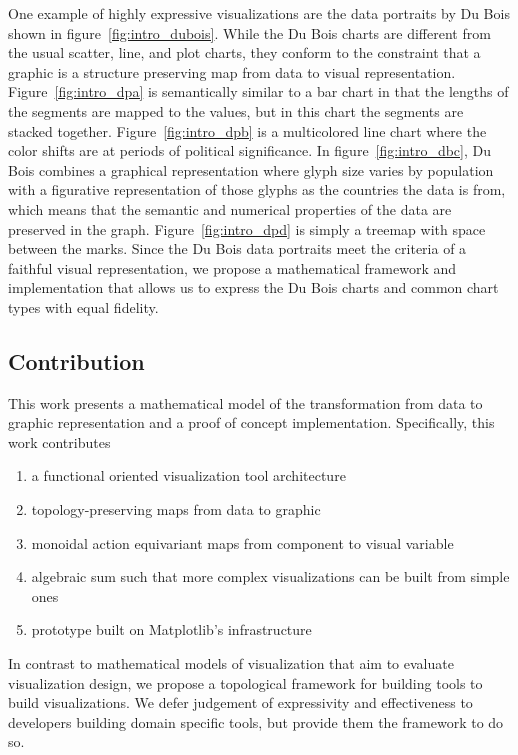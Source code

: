 \documentclass[../main.tex]{subfiles}
\begin{document}
One example of highly expressive visualizations are the data portraits by Du Bois shown in figure~\ref{fig:intro_dubois}. While the Du Bois charts are different from the usual scatter, line, and plot charts, they conform to the constraint that a graphic is a structure preserving map from data to visual representation. Figure~\ref{fig:intro_dpa} is semantically similar to a bar chart in that the lengths of the segments are mapped to the values, but in this chart the segments are stacked together. Figure~\ref{fig:intro_dpb} is a multicolored line chart where the color shifts are at periods of political significance. In figure~\ref{fig:intro_dbc}, Du Bois combines a graphical representation where glyph size varies by population with a figurative representation of those glyphs as the countries the data is from, which means that the semantic and numerical properties of the data are preserved in the graph. Figure~\ref{fig:intro_dpd} is simply a treemap\cite{heerTourVisualizationZoo2010} with space between the marks. Since the Du Bois data portraits meet the criteria of a faithful visual representation, we propose a mathematical framework and implementation that allows us to express the Du Bois charts and common chart types with equal fidelity. 

\subsection{Contribution}
This work presents a mathematical model of the transformation from data to graphic representation and a proof of concept implementation. Specifically, this work contributes

\begin{enumerate}
    \item a functional oriented visualization tool architecture
    \item topology-preserving maps from data to graphic 
    \item monoidal action equivariant maps from component to visual variable 
    \item algebraic sum such that more complex visualizations can be built from simple ones 
    \item prototype built on Matplotlib's infrastructure
\end{enumerate}
In contrast to mathematical models of visualization that aim to evaluate visualization design, we propose a topological framework for building tools to build visualizations. We defer judgement of expressivity and effectiveness to developers building domain specific tools, but provide them the framework to do so. 
\end{document}
